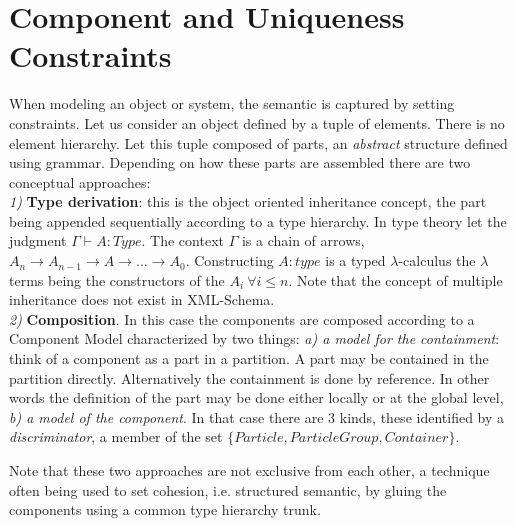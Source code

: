 \section{Component and Uniqueness Constraints} 
When modeling an object or system, the semantic is captured by setting constraints.
Let us consider an object defined by a tuple of elements. There is no element hierarchy. 
Let this tuple composed of parts, an {\it abstract} structure defined using grammar. 
Depending on how these parts are assembled there are two conceptual approaches:\\
{\it 1)} {\bf Type derivation}: this is the object oriented inheritance concept, 
the part being appended sequentially according to a type hierarchy. In type theory 
let the judgment $\Gamma \vdash A\!:\!Type$. The context $\Gamma$ is  a chain of arrows, 
$A_n\rightarrow A_{n-1}\rightarrow A\rightarrow ...\rightarrow A_0$. Constructing $A\!:\!type$ is a typed $\lambda$-calculus
the $\lambda$ terms being the constructors of the $A_i ~\forall i\le n$.
Note that the concept of multiple inheritance does not exist in XML-Schema.\\
{\it 2)} {\bf Composition}. In this case the components are composed according to 
a Component Model characterized by two things: 
{\it a) a model for the containment}: think of a component as a part in a partition. 
A part may be contained in the partition directly. Alternatively the containment is done by reference. 
In other words the definition of the part may be done either locally or at the global level,
{\it b) a model of the component}. In that case there are 3 kinds, these identified by a {\it discriminator}, 
a member of the set $\{Particle,ParticleGroup, Container\}$. 

Note that these two approaches are not exclusive from each other, a technique often being used 
to set cohesion, i.e. structured semantic, by gluing the components using a common 
type hierarchy trunk.

